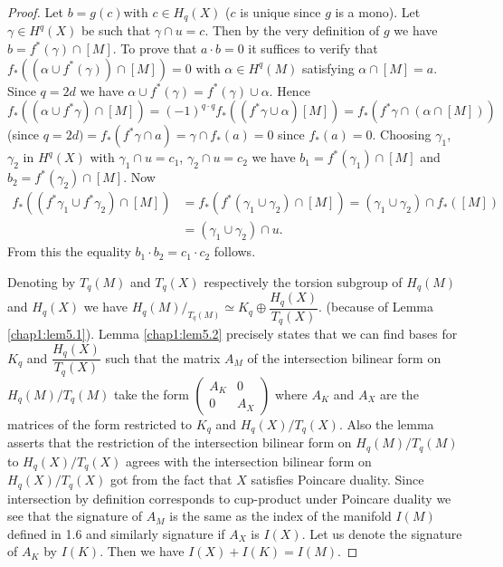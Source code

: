 \begin{proof}
Let $b = g(c)$\pageoriginale with $ c \in H_q (X)$ ($c$ is unique
since $g$ is a mono). Let $\gamma \in H^q (X)$ be such that
$\gamma \cap u = 
c$. Then by the very definition of $g$ we have $b = f^* (\gamma) \cap
[M]$. To prove that $a \cdot b = 0$ it suffices to verify that $f_*
((\alpha \cup f^* (\gamma)) \cap [M]) = 0$ with $\alpha \in H^q
(M)$ satisfying $\alpha \cap [M] = a$. Since $q = 2d $ we have $\alpha
\cup f^* (\gamma ) = f^* (\gamma) \cup \alpha$. Hence $f_* ((\alpha
\cup f^* \gamma ) \cap [M])= (-1)^{q \cdot q} f_* ((f^* \gamma \cup \alpha )
     [M] ) = f_* (f^* \gamma \cap (\alpha \cap [M]))$ (since $q = 2d )
     = f_* (f^* \gamma \cap a ) = \gamma \cap f_* (a) = 0 $ since
     $f_*(a) =0$. Choosing $\gamma_1$, $\gamma_2$ in $H^q (X)$ with
     $\gamma_1 \cap u= c_1$, $\gamma_2 \cap u = c_2$ we have $b_1 =
     f^* (\gamma_1) \cap [M]$ and $b_2 = f^* (\gamma_2) \cap [M]$. Now 
\begin{align*}
f_* ((f^* \gamma_1 \cup f^* \gamma_2) \cap [M]) & = f_* (f^*(\gamma_1
\cup \gamma_2 ) \cap [M]) = (\gamma_1 \cup \gamma_2 ) \cap f_*
([M])\\ 
&= (\gamma_1 \cup \gamma_2) \cap u.
\end{align*}
From this the equality $b_1 \cdot b_2= c_1 \cdot c_2$ follows. 

Denoting by $T_q (M)$ and $T_q (X)$ respectively the torsion subgroup
of $H_q (M)$ and $H_q (X)$ we have $H_q (M)/_{T_q (M)} \simeq K_q
\oplus \dfrac{H_q (X)}{T_q (X)}$. (because of Lemma
\ref{chap1:lem5.1}). Lemma \ref{chap1:lem5.2} 
precisely states that we can find bases for $K_q $ and $\dfrac{H_q
  (X)}{T_q (X)}$ such that the matrix $A_M$ of the intersection
bilinear form on $H_q (M)/ T_q (M)$ take the form
$\left( \begin{smallmatrix} A_K & 0\\ 0&A_X\end{smallmatrix}
  \right)$\pageoriginale 
  where $A_K$ and $A_X$ are the matrices of the form restricted to
  $K_q$ and $H_q (X)/ T_q (X)$. Also the lemma asserts that the
  restriction of the intersection bilinear form on $H_q (M)/ T_q (M)$
  to $H_q (X)/ T_q (X)$ agrees with the intersection bilinear form on
  $H_q (X) / T_q (X)$ got from the fact that $X$ satisfies Poincare
  duality. Since intersection by definition corresponds to cup-product
  under Poincare duality we see that the signature of $A_M$ is the
  same as the index of the manifold $I(M)$ defined in 1.6 and
  similarly signature if $A_X$ is $I(X)$. Let us denote the signature
  of $A_K$ by $I(K)$. Then we have $I(X) + I(K)= I(M)$. 
\end{proof}

